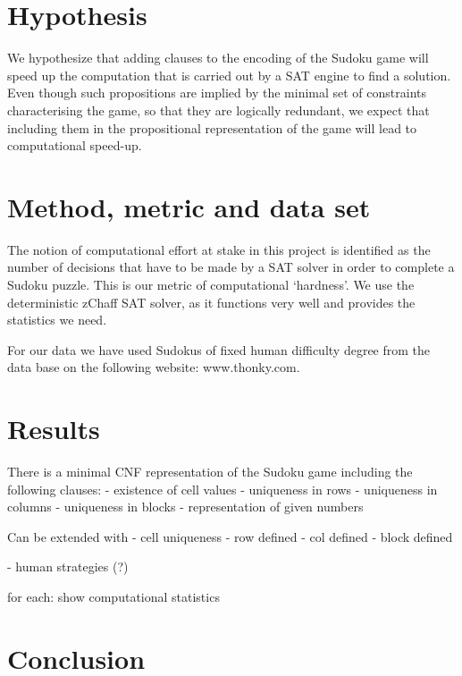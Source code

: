 \documentclass[10pt,a4paper,leqno]{article}
\begin{document}
\section*{Hypothesis}

We hypothesize that adding clauses to the encoding of the Sudoku game will speed up the computation that is carried out by a SAT engine to find a solution. Even though such propositions are implied by the minimal set of constraints characterising the game, so that they are logically redundant, we expect that including them in the propositional representation of the game will lead to computational speed-up. 

\section*{Method, metric and data set}

The notion of computational effort at stake in this project is identified as the number of decisions that have to be made by a SAT solver in order to complete a Sudoku puzzle. This is our metric of computational `hardness'. We use the deterministic zChaff SAT solver, as it functions very well and provides the statistics we need. 

For our data we have used Sudokus of fixed human difficulty degree from the data base on the following website: www.thonky.com. 


\section*{Results}

There is a minimal CNF representation of the Sudoku game including the following clauses:
- existence of cell values
- uniqueness in rows
- uniqueness in columns
- uniqueness in blocks
- representation of given numbers


Can be extended with
- cell uniqueness
- row defined
- col defined
- block defined

- human strategies (?)

for each: show computational statistics 

\section*{Conclusion}
\end{document}
